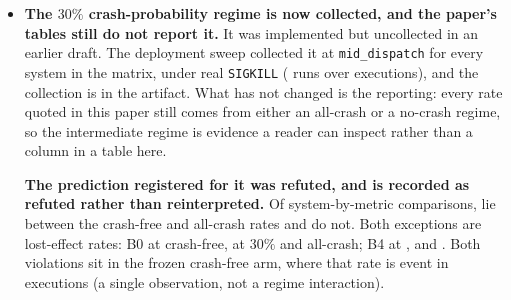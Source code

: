 \documentclass[10pt,journal,compsoc]{IEEEtran}
\begin{document}
\begin{itemize}
\item \textbf{The $30\%$ crash-probability regime is now collected, and the
      paper's tables still do not report it.} It was implemented but
      uncollected in an earlier draft. The deployment sweep collected it at
      \texttt{mid\_dispatch} for every system in the matrix, under real
      \texttt{SIGKILL} (\PthirtyRuns{} runs over \PthirtyExecutions{}
      executions), and the collection is in the artifact. What has not
      changed is the reporting: every rate quoted in this paper still comes
      from either an all-crash or a no-crash regime, so the intermediate
      regime is evidence a reader can inspect rather than a column in a
      table here.

      \textbf{The prediction registered for it was refuted, and is recorded
      as refuted rather than reinterpreted.} Of \PthirtyComparisons{}
      system-by-metric comparisons, \PthirtyBetween{} lie between the
      crash-free and all-crash rates and \PthirtyExceptions{} do not. Both
      exceptions are lost-effect rates: B0 at \PthirtyBzeroPzero{} crash-free,
      \PthirtyBzeroPthirty{} at $30\%$ and \PthirtyBzeroCrashed{}
      all-crash; B4 at \PthirtyBfourPzero{}, \PthirtyBfourPthirty{} and
      \PthirtyBfourCrashed{}. Both violations sit in the frozen crash-free
      arm, where that rate is \PthirtyPzeroEvents{} event in
      \PthirtyPzeroExecs{} executions (a single observation, not a regime
      interaction).


\end{itemize}
\end{document}
